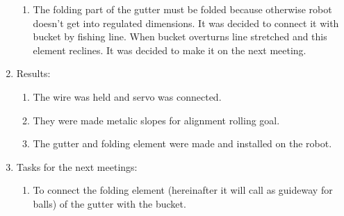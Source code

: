 \begin{enumerate}
\begin{enumerate}
		\item The folding part of the gutter must be folded because otherwise robot doesn't get into regulated dimensions. It was decided to connect it with bucket by fishing line. When bucket overturns line stretched and this element reclines. It was decided to make it on the next meeting.

	\end{enumerate}
	
	\item Results:
	\begin{enumerate}
		
		\item The wire was held and servo was connected.
		
		\item They were made metalic slopes for alignment rolling goal.
		
        \item The gutter and folding element were made and installed on the robot.
		
	\end{enumerate}
	
	\item Tasks for the next meetings:
	\begin{enumerate}
		
		\item To connect the folding element (hereinafter it will call as guideway for balls) of the gutter with the bucket.
			
	\end{enumerate}
\end{enumerate}
\fillpage
